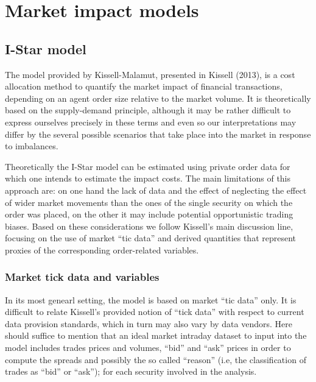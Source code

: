 \hypertarget{market-impact-models}{%
\section{Market impact models}\label{market-impact-models}}

\hypertarget{i-star-model}{%
\subsection{I-Star model}\label{i-star-model}}

The model provided by Kissell-Malamut, presented in Kissell (2013), is a
cost allocation method to quantify the market impact of financial
transactions, depending on an agent order size relative to the market
volume. It is theoretically based on the supply-demand principle,
although it may be rather difficult to express ourselves precisely in
these terms and even so our interpretations may differ by the several
possible scenarios that take place into the market in response to
imbalances.

Theoretically the I-Star model can be estimated using private order data
for which one intends to estimate the impact costs. The main limitations
of this approach are: on one hand the lack of data and the effect of
neglecting the effect of wider market movements than the ones of the
single security on which the order was placed, on the other it may
include potential opportunistic trading biases. Based on these
considerations we follow Kissell's main discussion line, focusing on the
use of market ``tic data'' and derived quantities that represent proxies
of the corresponding order-related variables.

\hypertarget{market-tick-data-and-variables}{%
\subsubsection{Market tick data and
variables}\label{market-tick-data-and-variables}}

In its most genearl setting, the model is based on market ``tic data''
only. It is difficult to relate Kissell's provided notion of ``tick
data'' with respect to current data provision standards, which in turn
may also vary by data vendors. Here should suffice to mention that an
ideal market intraday dataset to input into the model includes trades
prices and volumes, ``bid'' and ``ask'' prices in order to compute the
spreads and possibly the so called ``reason'' (i.e, the classification
of trades as ``bid'' or ``ask''); for each security involved in the
analysis.

